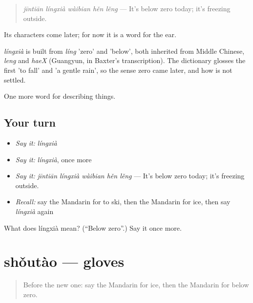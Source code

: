 \begin{quote}
\emph{jīntiān língxià wàibian hěn lěng} — It's below zero today; it's freezing outside.
\end{quote}

Its characters come later; for now it is a word for the ear.

\begin{cousinweb}
\emph{língxià} is built from \emph{líng} 'zero' and  'below', both inherited from Middle Chinese, \emph{leng} and \emph{haeX} (Guangyun, in Baxter's transcription). The dictionary glosses the first 'to fall' and 'a gentle rain', so the sense zero came later, and how is not settled.
\end{cousinweb}

\begin{grammarlens}[title={What you've built}]
One more word for describing things.
\end{grammarlens}

\subsection*{Your turn}
\begin{itemize}
\raggedright
  \item \emph{Say it:} \emph{língxià}
  \item \emph{Say it:} \emph{língxià}, once more
  \item \emph{Say it:} \emph{jīntiān língxià wàibian hěn lěng} — It's below zero today; it's freezing outside.
  \item \emph{Recall:} say the Mandarin for to ski, then the Mandarin for ice, then say \emph{língxià} again
\end{itemize}

\begin{tcolorbox}[breakable,colback=teal!4,colframe=teal!35!black,title={Before you move on}]
What does língxià mean? (\textquotedblleft{}Below zero\textquotedblright{}.) Say it once more.
\end{tcolorbox}
\section[shǒutào]{shǒutào — gloves}

\label{lesson:ZH-C221-shoutao}



\begin{quote}
Before the new one: say the Mandarin for ice, then the Mandarin for below zero.
\end{quote}

